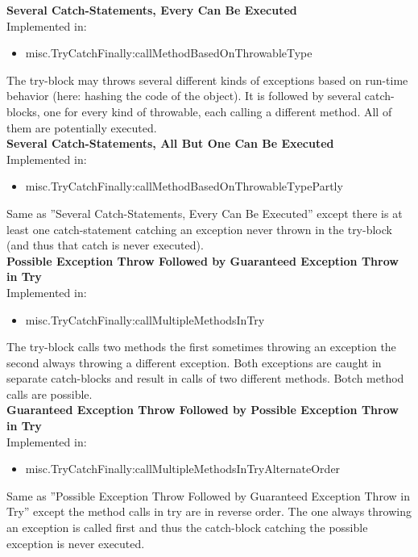 \documentclass{article}
\begin{document}
\noindent
\textbf{Several Catch-Statements, Every Can Be Executed}\\
Implemented in: 
\begin{itemize}
    \item misc.TryCatchFinally:callMethodBasedOnThrowableType
\end{itemize}
The try-block may throws several different kinds of exceptions based on run-time behavior (here: hashing the code of the object). It is followed by several catch-blocks, one for every kind of throwable, each calling a different method. All of them are potentially executed.\\

\noindent
\textbf{Several Catch-Statements, All But One Can Be Executed}\\
Implemented in: 
\begin{itemize}
    \item misc.TryCatchFinally:callMethodBasedOnThrowableTypePartly
\end{itemize}
Same as ''Several Catch-Statements, Every Can Be Executed'' except there is at least one catch-statement catching an exception never thrown in the try-block (and thus that catch is never executed).\\

\noindent
\textbf{Possible Exception Throw Followed by Guaranteed Exception Throw in Try}\\
Implemented in: 
\begin{itemize}
    \item misc.TryCatchFinally:callMultipleMethodsInTry
\end{itemize}
The try-block calls two methods the first sometimes throwing an exception the second always throwing a different exception. Both exceptions are caught in separate catch-blocks and result in calls of two different methods. Botch method calls are possible.\\

\noindent
\textbf{Guaranteed Exception Throw Followed by Possible Exception Throw in Try}\\
Implemented in: 
\begin{itemize}
    \item misc.TryCatchFinally:callMultipleMethodsInTryAlternateOrder
\end{itemize}
Same as ''Possible Exception Throw Followed by Guaranteed Exception Throw in Try'' except the method calls in try are in reverse order. The one always throwing an exception is called first and thus the catch-block catching the possible exception is never executed.\\
\end{document}
